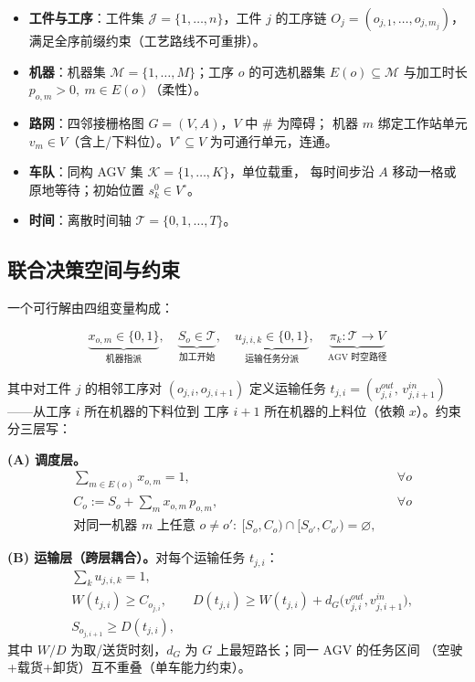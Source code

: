 \documentclass[UTF8,12pt,a4paper]{ctexart}
\begin{document}
\begin{itemize}
  \item \textbf{工件与工序}：工件集 $\mathcal{J}=\{1,\dots,n\}$，工件 $j$ 的工序链
    $O_j=(o_{j,1},\dots,o_{j,m_j})$，满足全序前缀约束（工艺路线不可重排）。
  \item \textbf{机器}：机器集 $\mathcal{M}=\{1,\dots,M\}$；工序 $o$ 的可选机器集
    $E(o)\subseteq\mathcal{M}$ 与加工时长 $p_{o,m}>0,\ m\in E(o)$（柔性）。
  \item \textbf{路网}：四邻接栅格图 $G=(V,A)$，$V$ 中 $\texttt{\#}$ 为障碍；
    机器 $m$ 绑定工作站单元 $v_m\in V$（含上/下料位）。$V^{\circ}\subseteq V$
    为可通行单元，连通。
  \item \textbf{车队}：同构 AGV 集 $\mathcal{K}=\{1,\dots,K\}$，单位载重，
    每时间步沿 $A$ 移动一格或原地等待；初始位置 $s^0_k\in V^{\circ}$。
  \item \textbf{时间}：离散时间轴 $\mathcal{T}=\{0,1,\dots,T\}$。
\end{itemize}

\subsection{联合决策空间与约束}\label{ssec:decision}

一个可行解由四组变量构成：

\begin{equation}
\underbrace{x_{o,m}\in\{0,1\}}_{\text{机器指派}},\quad
\underbrace{S_o\in\mathcal{T}}_{\text{加工开始}},\quad
\underbrace{u_{j,i,k}\in\{0,1\}}_{\text{运输任务分派}},\quad
\underbrace{\pi_k:\mathcal{T}\to V}_{\text{AGV 时空路径}}
\end{equation}

其中对工件 $j$ 的相邻工序对 $(o_{j,i},o_{j,i+1})$ 定义运输任务
$t_{j,i}=(v^{out}_{j,i},\,v^{in}_{j,i+1})$——从工序 $i$ 所在机器的下料位到
工序 $i+1$ 所在机器的上料位（依赖 $x$）。约束分三层写：

\textbf{(A) 调度层。}
\begin{align}
&\sum_{m\in E(o)} x_{o,m}=1, && \forall o \label{eq:assign}\\
& C_o := S_o + \sum_{m} x_{o,m}\, p_{o,m}, && \forall o \label{eq:comp}\\
& \text{对同一机器 } m \text{ 上任意 } o\ne o':\ 
   [S_o, C_o)\cap[S_{o'}, C_{o'})=\varnothing, && \label{eq:machine}
\end{align}

\textbf{(B) 运输层（跨层耦合）。}对每个运输任务 $t_{j,i}$：
\begin{align}
& \sum_k u_{j,i,k}=1, \label{eq:agvassign}\\
& W(t_{j,i}) \ge C_{o_{j,i}}, \qquad
  D(t_{j,i}) \ge W(t_{j,i}) + d_G\big(v^{out}_{j,i},v^{in}_{j,i+1}\big), \label{eq:transpwindow}\\
& S_{o_{j,i+1}} \ge D(t_{j,i}), \label{eq:handoff}
\end{align}
其中 $W/D$ 为取/送货时刻，$d_G$ 为 $G$ 上最短路长；同一 AGV 的任务区间
（空驶+载货+卸货）互不重叠（单车能力约束）。
\end{document}
